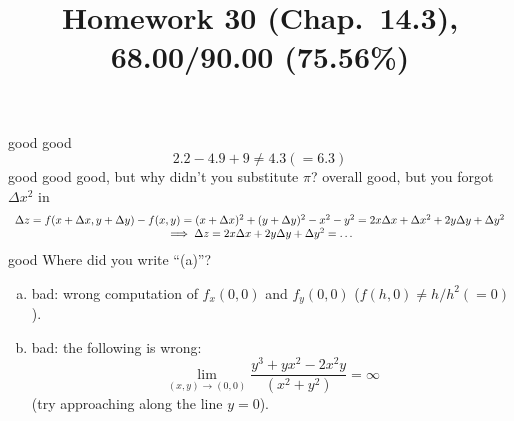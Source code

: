 \documentclass[pstricks,10pt,dvipsnames]{article} %
\title{Homework 30 (Chap.~14.3),
68.00/90.00 (75.56\%)
}
\begin{document}
\maketitle
{}
good
good
\begin{equation*}
	2.2-4.9+9\neq4.3\left( =6.3 \right)
\end{equation*}
good
good
good, but why didn't you substitute $\pi$?
overall good, but you forgot $\Delta x^2$ in
\begin{equation*}
	\begin{array}[]{c}
		\Delta z=f(x+\Delta x,y+\Delta y)-f(x,y)=(x+\Delta x)^2+(y+\Delta y)^2-x^2-y^2=2x\Delta x+\Delta x^2+
		2y\Delta y+\Delta y^2\\\implies
		\Delta z=2x\Delta x+2y\Delta y+\Delta y^2=\dots
	\end{array}
\end{equation*}
good
Where did you write ``(a)''?
\begin{enumerate}[(a)]
	\item bad: wrong computation of $f_x(0,0)$ and $f_y(0,0)$ ($f(h,0)\neq h/h^2(=0)$).
	\item bad: the following is wrong:
		\begin{equation*}
			\lim_{(x,y)\to(0,0)}\frac{y^3+yx^2-2x^2y}{(x^2+y^2)}=\infty
		\end{equation*}
		(try approaching along the line $y=0$).
\end{enumerate}
\end{document}
